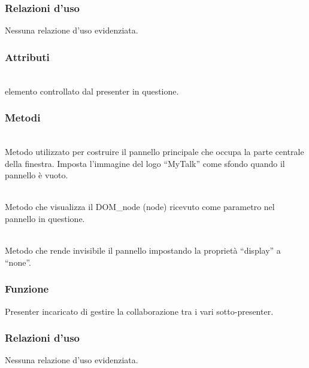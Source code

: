\subsubsection*{Relazioni d'uso}
Nessuna relazione d'uso evidenziata.

\subsubsection*{Attributi}
\begin{description}
\item{}\\
  elemento controllato dal presenter in questione.
\end{description}

\subsubsection*{Metodi}
\begin{description}
\item{}\\
Metodo utilizzato per costruire il pannello principale che occupa la parte centrale della finestra. Imposta l'immagine del logo ``MyTalk'' come sfondo quando il pannello è vuoto.

\item{}\\
Metodo che visualizza il DOM\_node (node) ricevuto come parametro nel pannello in questione.
	
\item{}\\
Metodo che rende invisibile il pannello impostando la proprietà ``display'' a ``none''.

\end{description}


\subsubsection*{Funzione}
Presenter incaricato di gestire la collaborazione tra i vari sotto-presenter.

\subsubsection*{Relazioni d'uso}
Nessuna relazione d'uso evidenziata.


